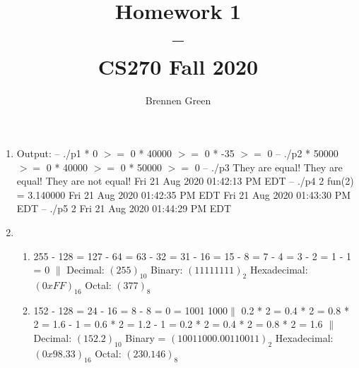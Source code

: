 \documentclass[11pt]{article}
\begin{document}
\title{Homework 1\\--\\\large CS270 Fall 2020}
\author{Brennen Green}
\maketitle


\begin{enumerate}
    \item Output: \newline
        -- ./p1 * 0 $>=$ 0 * 40000 $>=$ 0 * -35 $>=$ 0\newline
        \newline
        -- ./p2 * 50000 $>=$ 0 * 40000 $>=$ 0 * 50000 $>=$ 0\newline
        \newline
        -- ./p3\newline
        They are equal!\newline
        They are equal!\newline
        They are not equal!\newline
        \newline
        Fri 21 Aug 2020 01:42:13 PM EDT\newline
        -- ./p4 2\newline
        fun(2) = 3.140000\newline
        Fri 21 Aug 2020 01:42:35 PM EDT\newline
        \newline
        Fri 21 Aug 2020 01:43:30 PM EDT\newline
        -- ./p5 2\newline
        Fri 21 Aug 2020 01:44:29 PM EDT\newline
        \newpage
    \item \begin{enumerate}
        \item 255 - 128 = 127 - 64 = 63 - 32 = 31 - 16 = 15 - 8 = 7 - 4 = 3 - 2 = 1 - 1 = 0 
        $\|$ \newline Decimal: $(255)_{10}$ Binary: $(1111 1111)_2$ Hexadecimal: $(0xFF)_{16}$ Octal: $(377)_8$
        \item 152 - 128 = 24 - 16 = 8 - 8 = 0 = 1001 1000$\|$ 0.2 * 2 = 0.4 * 2 = 0.8 * 2 = 1.6 - 1 = 0.6 * 2 = 1.2 - 1 = 0.2 * 2 = 0.4 * 2 = 0.8 * 2 = 1.6 $\|$ \newline Decimal: $(152.2)_{10}$ Binary = $(10011000.00110011)_{2}$ Hexadecimal: $(0x98.33)_{16}$ Octal: $(230.146)_8$

\end{enumerate}
\end{enumerate}
\end{document}
